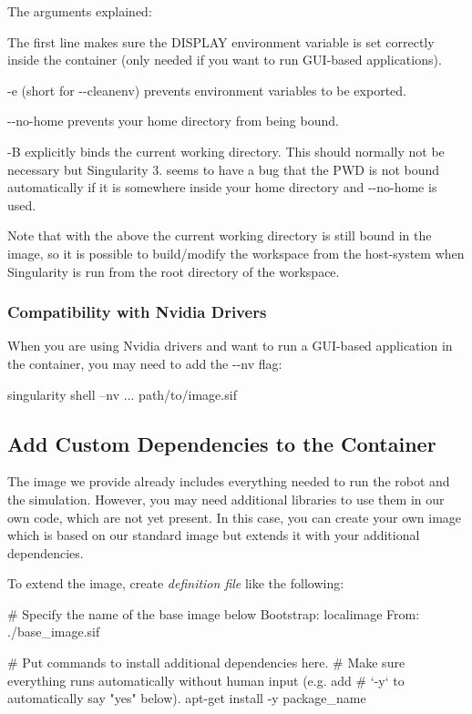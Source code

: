 The arguments explained\+:


\begin{DoxyItemize}
\item The first line makes sure the D\+I\+S\+P\+L\+AY environment variable is set correctly inside the container (only needed if you want to run G\+U\+I-\/based applications).
\item {\ttfamily -\/e} (short for {\ttfamily -\/-\/cleanenv}) prevents environment variables to be exported.
\item {\ttfamily -\/-\/no-\/home} prevents your home directory from being bound.
\item {\ttfamily -\/B } explicitly binds the current working directory. This should normally not be necessary but Singularity 3. seems to have a bug that the P\+WD is not bound automatically if it is somewhere inside your home directory and {\ttfamily -\/-\/no-\/home} is used.
\end{DoxyItemize}

Note that with the above the current working directory is still bound in the image, so it is possible to build/modify the workspace from the host-\/system when Singularity is run from the root directory of the workspace.

\subsubsection*{Compatibility with Nvidia Drivers}

When you are using Nvidia drivers and want to run a G\+U\+I-\/based application in the container, you may need to add the {\ttfamily -\/-\/nv} flag\+: \begin{DoxyVerb}singularity shell --nv ... path/to/image.sif
\end{DoxyVerb}


\subsection*{Add Custom Dependencies to the Container }

The image we provide already includes everything needed to run the robot and the simulation. However, you may need additional libraries to use them in our own code, which are not yet present. In this case, you can create your own image which is based on our standard image but extends it with your additional dependencies.

To extend the image, create {\itshape definition file} like the following\+: \begin{DoxyVerb}# Specify the name of the base image below
Bootstrap: localimage
From: ./base_image.sif

    # Put commands to install additional dependencies here.
    # Make sure everything runs automatically without human input (e.g. add
    # `-y` to automatically say "yes" below).
    apt-get install -y package_name
\end{DoxyVerb}


